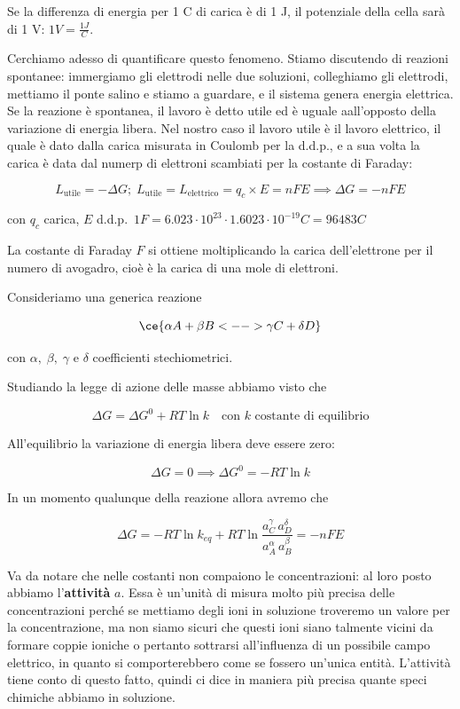 Se la differenza di energia per 1 C di carica è di 1 J, il potenziale della cella sarà di 1 V: $1 V=\frac{1J}{C}$.

Cerchiamo adesso di quantificare questo fenomeno. Stiamo discutendo di reazioni spontanee: immergiamo gli elettrodi nelle due soluzioni, colleghiamo gli elettrodi, mettiamo il ponte salino e stiamo a guardare, e il sistema genera energia elettrica. Se la reazione è spontanea, il lavoro è detto utile ed è uguale aall'opposto della variazione di energia libera. Nel nostro caso il lavoro utile è il lavoro elettrico, il quale è dato dalla carica misurata in Coulomb per la d.d.p., e a sua volta la carica è data dal numerp di elettroni scambiati per la costante di Faraday:

$$L_{\text{utile}}=- \Delta G; \; L_{\text{utile}}=L_{\text{elettrico}}=q_c \times E=nFE \implies \Delta G = -nFE$$

con $q_c$ carica, $E$ d.d.p.\, $1F=6.023 \cdot 10^{23} \cdot 1.6023 \cdot 10^{-19} C = 96483 C$

La costante di Faraday $F$ si ottiene moltiplicando la carica dell'elettrone per il numero di avogadro, cioè è la carica di una mole di elettroni.

Consideriamo una generica reazione

$$\ce{\alpha A + \beta B <--> \gamma C + \delta D}$$

con $\alpha, \; \beta, \; \gamma$ e $\delta$ coefficienti stechiometrici.

Studiando la legge di azione delle masse abbiamo visto che

$$\Delta G = \Delta G^0 + RT\ln k \quad \text{con }k \text{ costante di equilibrio}$$

All'equilibrio la variazione di energia libera deve essere zero:

$$\Delta G=0 \implies \Delta G^0= -RT \ln k$$

In un momento qualunque della reazione allora avremo che

$$\Delta G =  -RT \ln k_{eq} + RT \ln \frac{a_C^{\gamma} \, a_D^{\delta}}{a_A^{\alpha} \, a_B^{\beta}}=-nFE$$

Va da notare che nelle costanti non compaiono le concentrazioni: al loro posto abbiamo l'\textbf{attività} $a$. Essa è un'unità di misura molto più precisa delle concentrazioni perché se mettiamo degli ioni in soluzione troveremo un valore per la concentrazione, ma non siamo sicuri che questi ioni siano talmente vicini da formare coppie ioniche o pertanto sottrarsi all'influenza di un possibile campo elettrico, in quanto si comporterebbero come se fossero un'unica entità. L'attività tiene conto di questo fatto, quindi ci dice in maniera più precisa quante speci chimiche abbiamo in soluzione.


